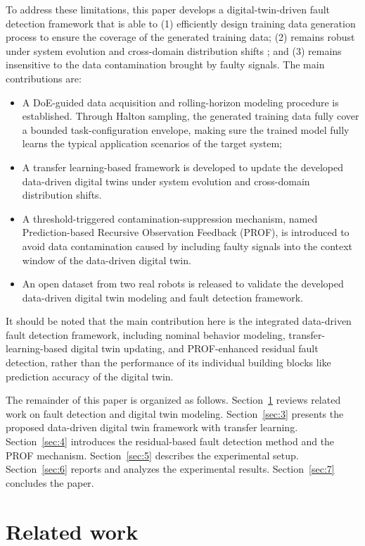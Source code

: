\documentclass[a4paper,10pt]{cas-sc}%
\newcommand{\rev}[1]{\textcolor{revisionred}{#1}}
\begin{document}
\rev{To address these limitations, this paper develops a digital-twin-driven fault detection framework that is able to (1) efficiently design training data generation process to ensure the coverage of the generated training data; (2) remains robust under system evolution and cross-domain distribution shifts ; and (3) remains insensitive to the data contamination brought by faulty signals. The main contributions are:}
\begin{itemize}
	\color{revisionred}
	\item A DoE-guided data acquisition and rolling-horizon modeling procedure is established. Through Halton sampling, the generated training data fully cover a bounded task-configuration envelope, making sure the trained model fully learns the typical application scenarios of the target system;
	\item A transfer learning-based framework is developed to update the developed data-driven digital twins under system evolution and cross-domain distribution shifts.
	\item A threshold-triggered contamination-suppression mechanism, named Prediction-based Recursive Observation Feedback (PROF), is introduced to avoid data contamination caused by including faulty signals into the context window of the data-driven digital twin. 
	\item An open dataset from two real robots is released to validate the developed data-driven digital twin modeling and fault detection framework.
\end{itemize}
\rev{It should be noted that the main contribution here is the integrated data-driven fault detection framework, including nominal behavior modeling, transfer-learning-based digital twin updating, and PROF-enhanced residual fault detection, rather than the performance of its individual building blocks like prediction accuracy of the digital twin.}

The remainder of this paper is organized as follows.
Section~\ref{sec:2} reviews related work on fault detection and digital twin modeling.
Section~\ref{sec:3} presents the proposed data-driven digital twin framework with transfer learning.
Section~\ref{sec:4} introduces the residual-based fault detection method and the PROF mechanism.
Section~\ref{sec:5} describes the experimental setup.
Section~\ref{sec:6} reports and analyzes the experimental results.
Section~\ref{sec:7} concludes the paper.

\section{Related work}\label{sec:2}
\end{document}
